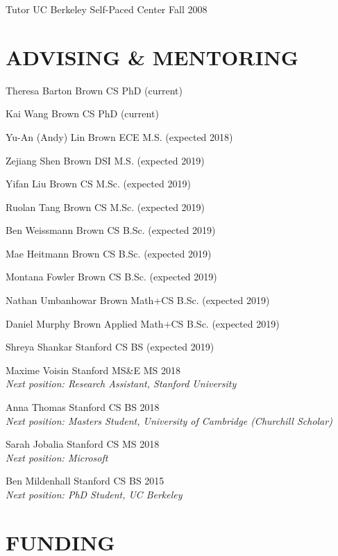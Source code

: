 \documentclass[line,margin]{res}
\begin{document}
\begin{resume}
\teach
{Tutor}
{UC Berkeley Self-Paced Center}
{Fall 2008}


\section{ADVISING \& MENTORING}

\newcommand{\currentphd}[2] {
	#1 \hfill #2 (current)
}

\newcommand{\student}[3] {
	#1 \hfill #2 (expected #3)
}

\newcommand{\alumni}[4] {
	#1 \hfill #2 #3\\
	\emph{Next position: #4}
}

\currentphd
{Theresa Barton}
{Brown CS PhD}

\currentphd
{Kai Wang}
{Brown CS PhD}

\student
{Yu-An (Andy) Lin}
{Brown ECE M.S.}
{2018}

\student
{Zejiang Shen}
{Brown DSI M.S.}
{2019}

\student
{Yifan Liu}
{Brown CS M.Sc.}
{2019}

\student
{Ruolan Tang}
{Brown CS M.Sc.}
{2019}

\student
{Ben Weissmann}
{Brown CS B.Sc.}
{2019}

\student
{Mae Heitmann}
{Brown CS B.Sc.}
{2019}

\student
{Montana Fowler}
{Brown CS B.Sc.}
{2019}

\student
{Nathan Umbanhowar}
{Brown Math+CS B.Sc.}
{2019}

\student
{Daniel Murphy}
{Brown Applied Math+CS B.Sc.}
{2019}

\student
{Shreya Shankar}
{Stanford CS BS}
{2019}

\alumni
{Maxime Voisin}
{Stanford MS\&E MS}
{2018}
{Research Assistant, Stanford University}

\alumni
{Anna Thomas}
{Stanford CS BS}
{2018}
{Masters Student, University of Cambridge (Churchill Scholar)}

\alumni
{Sarah Jobalia}
{Stanford CS MS}
{2018}
{Microsoft}

\alumni
{Ben Mildenhall}
{Stanford CS BS}
{2015}
{PhD Student, UC Berkeley}


\section{FUNDING}


\end{resume}
\end{document}
